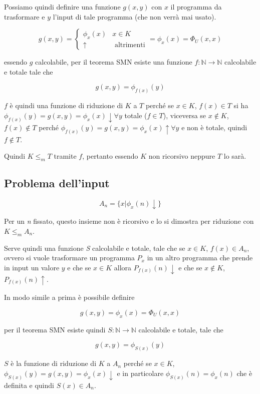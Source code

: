 Possiamo quindi definire una funzione $ g(x,y) $ con $ x $ il programma da trasformare e $ y $ l'input di tale programma (che non verrà mai usato).

$$
g(x,y) = \begin{cases}
\phi_x(x) & x \in K \\
\uparrow & \text{ altrimenti}
\end{cases} = \phi_x(x) = \Phi_U(x,x)
$$

essendo $ g $ calcolabile, per il teorema SMN esiste una funzione $f : \mathbb{N} \rightarrow \mathbb{N}$ calcolabile e totale tale che

$$
g(x,y) = \phi_{f(x)}(y)
$$

$ f $ è quindi una funzione di riduzione di $ K $ a $ T $ perché se $ x \in K $, $ f(x) \in T $ si ha  $\phi_{f(x)}(y) = g(x,y) = \phi_x(x)\downarrow \forall y$ totale ($f \in T$), viceversa se $ x \notin K $, $f(x) \notin T$ perché $\phi_{f(x)}(y) = g(x,y) = \phi_x(x) \uparrow \forall y$ e non è totale, quindi $f \notin T$.

Quindi $ K \leq_m T $ tramite $ f $, pertanto essendo $ K $ non ricorsivo neppure $ T $ lo sarà.

\subsection{Problema dell'input}

$$
A_n = \{ x | \phi_x(n)\downarrow \}
$$

Per un \textit{n} fissato, questo insieme non è ricorsivo e lo si dimostra per riduzione con $ K \leq_m A_n $.

Serve quindi una funzione \textit{S} calcolabile e totale, tale che se $ x \in K $, $ f(x) \in A_n $, ovvero si vuole trasformare un programma $ P_x $ in un altro programma che prende in input un valore $ y $ e che se $x \in K$ allora $P_{f(x)}(n)\downarrow$ e che se $ x \notin K $, $P_{f(x)}(n)\uparrow$.

In modo simile a prima è possibile definire

$$
g(x,y) = \phi_x(x) = \Phi_U(x,x)
$$

per il teorema SMN esiste quindi $ S : \mathbb{N} \rightarrow \mathbb{N} $ calcolabile e totale, tale che 

$$
g(x,y) = \phi_{S(x)}(y)
$$

$ S $ è la funzione di riduzione di $ K $ a $ A_n $ perché se $ x \in K $, $ \phi_{S(x)}(y) = g(x,y) = \phi_x(x)\downarrow $ e in particolare $\phi_{S(x)}(n) = \phi_x(n) $ che è definita e quindi $S(x) \in A_n$.

